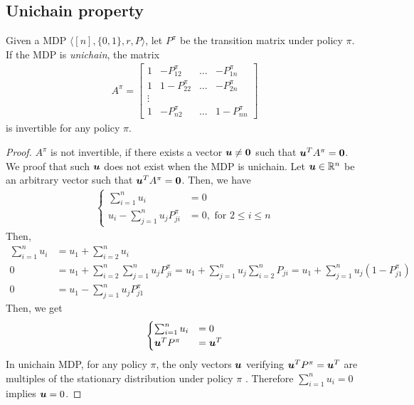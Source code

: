 \documentclass[acmsmall,screen,anonymous]{acmart}
\begin{document}
\subsection{Unichain property}

\begin{lemma}
\label{lem:invertible}
Given a MDP $\langle [n], \{0,1\}, r, P\rangle$, let $P^\pi$ be the transition matrix under policy $\pi$.
If the MDP is \emph{unichain}, the matrix
\begin{align*}
    A^{\pi}
        = \left[\begin{array}{ccccc}
                1 & - P_{12}^{\pi} & \dots & -P_{1n}^{\pi}\\
                1 & 1-P_{22}^{\pi} & \dots & -P_{2n}^{\pi}\\
                \vdots\\
                1 &  -P_{n2}^{\pi} & \dots &1-P_{nn}^{\pi}
    \end{array}\right]
\end{align*}
is invertible for any policy $\pi$.
\end{lemma}
\begin{proof}
    $A^\pi$ is not invertible, if there exists a vector $\boldsymbol{u}\neq\boldsymbol{0}$ such that $\boldsymbol{u}^T A^\pi=\boldsymbol{0}$.
    We proof that such $\boldsymbol{u}$ does not exist when the MDP is unichain.
    Let $\boldsymbol{u}\in\mathbb{R}^n$ be an arbitrary vector such that $\boldsymbol{u}^T A^\pi=\boldsymbol{0}$.
    Then, we have
    \begin{align*}
        \begin{cases}
            \sum_{i=1}^{n}u_i &= 0 \\
            u_i-\sum_{j=1}^{n}u_jP_{ji}^\pi &= 0, \text{ for } 2\le i\le n
        \end{cases}
    \end{align*}
    Then,
    \begin{align*}
        \sum_{i=1}^{n}u_i
        &= u_1 +\sum_{i=2}^{n}u_i \\
        0 &= u_1 +\sum_{i=2}^{n}\sum_{j=1}^{n}u_jP_{ji}^\pi = u_1 +\sum_{j=1}^{n}u_j\sum_{i=2}^{n}P_{ji} = u_1 +\sum_{j=1}^{n}u_j(1-P_{j1}^\pi) \\
        0 &= u_1 -\sum_{j=1}^{n}u_jP_{j1}^\pi
    \end{align*}
    Then, we get
    \begin{align*}
        \begin{cases}
            \sum_{i=1}^{n}u_i &= 0 \\
            \boldsymbol{u}^TP^\pi &=\boldsymbol{u}^T
        \end{cases}
    \end{align*}
    In unichain MDP, for any policy $\pi$, the only vectors $\boldsymbol{u}$ verifying $\boldsymbol{u}^TP^\pi=\boldsymbol{u}^T$ are multiples of  the stationary distribution under policy $\pi$ \cite{putermanMarkovDecisionProcesses1994}. Therefore  $\sum_{i=1}^{n}u_i = 0$ implies $\boldsymbol{u} = 0$.
  \end{proof}
\end{document}

